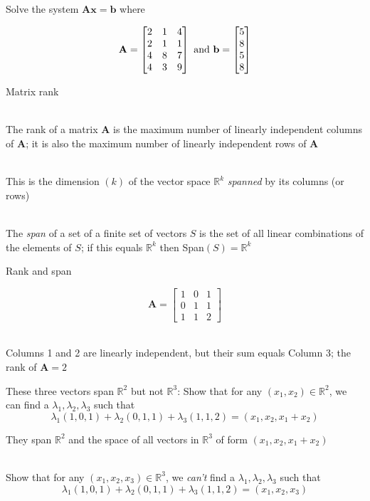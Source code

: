 \documentclass[10pt]{seminar}
\begin{document}
\begin{slide}
\newslide

Solve the system $\mathbf{Ax=b}$ where

$$\mathbf{A}=\begin{bmatrix}
2& 1& 4\\
2& 1& 1\\
4& 8& 7\\
4& 3& 9
\end{bmatrix}\hbox{ and }
\mathbf{b}=\begin{bmatrix}
5\\8\\5\\8
\end{bmatrix}
$$
\newslide

Matrix rank

\ \\The rank of a matrix $\mathbf{A}$ is the maximum number of linearly independent columns of $\mathbf{A}$; it is also the maximum number of linearly independent rows of $\mathbf{A}$

\ \\This is the dimension $(k)$ of the vector space $\mathbb{R}^k$ \textit{spanned} by its columns (or rows)

\ \\The \textit{span} of a set of a finite set of vectors $S$ is the set of all linear combinations of the elements of $S$; if this equals $\mathbb{R}^k$ then Span$(S)=\mathbb{R}^k$

\newslide

Rank and span

$$\mathbf{A}=\begin{bmatrix}
1&0&1\\
0&1&1\\
1&1&2
\end{bmatrix}$$

\ \\Columns 1 and 2 are linearly independent, but their sum equals Column 3; the rank of $\mathbf{A}=2$

These three vectors span $\mathbb{R}^2$ but not $\mathbb{R}^3$: Show that for any $(x_1, x_2)\in \mathbb{R}^2$, we can find a $\lambda_1, \lambda_2, \lambda_3$ such that $$\lambda_1(1, 0, 1)+\lambda_2(0, 1, 1)+\lambda_3(1, 1, 2)=(x_1, x_2, x_1+x_2)$$

They span $\mathbb{R}^2$ and the space of all vectors in $\mathbb{R}^3$ of form $(x_1, x_2, x_1+x_2)$

\ \\Show that for any $(x_1, x_2, x_3)\in \mathbb{R}^3$, we \textit{can't} find a $\lambda_1, \lambda_2, \lambda_3$ such that $$\lambda_1(1, 0, 1)+\lambda_2(0, 1, 1)+\lambda_3(1, 1, 2)=(x_1, x_2, x_3)$$


\end{slide}
\end{document}

